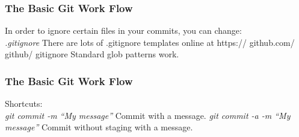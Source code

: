 \begin{frame}
\frametitle{\large The Basic Git Work Flow}
In order to ignore certain files in your commits, you can change: \\
\emph{.gitignore}
There are lots of .gitignore templates online at https:// github.com/ github/ gitignore
Standard glob patterns work.
\end{frame}
\note{}

\begin{frame}
\frametitle{\large The Basic Git Work Flow}
Shortcuts: \\
\emph{git commit -m ``My message''}
Commit with a message.
\emph{git commit -a -m ``My message''}
Commit without staging with a message.
\end{frame}
\note{}